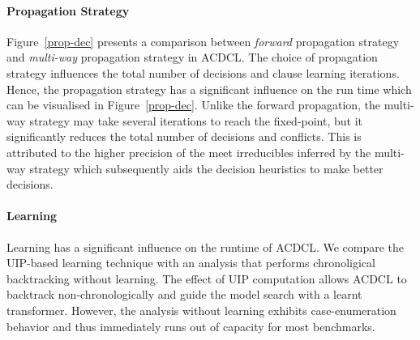 \paragraph {\textbf{Propagation Strategy}}      
Figure~\ref{prop-dec} presents a comparison between {\em forward} propagation 
strategy and {\em multi-way} propagation strategy in ACDCL.  The choice of 
propagation strategy influences the total number of decisions and clause 
learning iterations.  Hence, the propagation strategy has a significant 
influence on the run time which can be visualised in Figure~\ref{prop-dec}.  
Unlike the forward propagation, the multi-way strategy may take several 
iterations to reach the fixed-point, but it significantly reduces the 
total number of decisions and conflicts.  This is attributed to the higher 
precision of the meet irreducibles inferred by the multi-way strategy which 
subsequently aids the decision heuristics to make better decisions. 

\paragraph {\textbf{Learning}} Learning has a significant influence on
the runtime of ACDCL.  We compare the UIP-based learning technique with 
an analysis that performs chronoligical backtracking without learning. 
The effect of UIP computation allows ACDCL to backtrack non-chronologically 
and guide the model search with a learnt transformer.  However, the analysis 
without learning exhibits case-enumeration behavior and thus immediately 
runs out of capacity for most benchmarks. 


